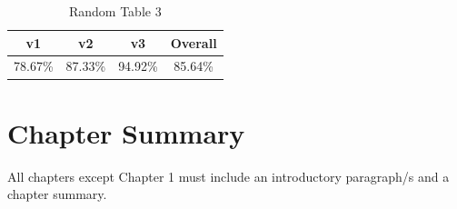 \begin{table}[ht]
  \caption[Random Table 3]{Random Table 3}
  \begin{center}
    \begin{tabular}{cccc}
      \hline \textbf{v1} & \textbf{v2} & \textbf{v3} & \textbf{Overall} \\ \hline
        78.67\% & 87.33\% & 94.92\% & 85.64\% \\ \hline
    \end{tabular}
  \end{center}
  \label{tab:random_table_3}
\end{table} 

\section{Chapter Summary}
All chapters except Chapter 1 must include an introductory paragraph/s and a chapter summary.

\FloatBarrier